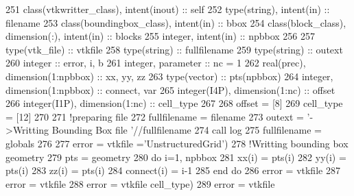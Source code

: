 \begin{DoxyCode}
251     \textcolor{keywordtype}{class}(vtkwritter\_class), \textcolor{keywordtype}{intent(inout)} :: self
252     \textcolor{keywordtype}{type}(string), \textcolor{keywordtype}{intent(in)} :: filename
253     \textcolor{keywordtype}{class}(boundingbox\_class), \textcolor{keywordtype}{intent(in)} :: bbox
254     \textcolor{keywordtype}{class}(block\_class), \textcolor{keywordtype}{dimension(:)}, \textcolor{keywordtype}{intent(in)} :: blocks
255     \textcolor{keywordtype}{integer}, \textcolor{keywordtype}{intent(in)} :: npbbox
256 
257     \textcolor{keywordtype}{type}(vtk\_file) :: vtkfile
258     \textcolor{keywordtype}{type}(string) :: fullfilename
259     \textcolor{keywordtype}{type}(string) :: outext
260     \textcolor{keywordtype}{integer} :: error, i, b
261     \textcolor{keywordtype}{integer}, \textcolor{keywordtype}{parameter} :: nc = 1
262     \textcolor{keywordtype}{real(prec)}, \textcolor{keywordtype}{dimension(1:npbbox)} :: xx, yy, zz
263     \textcolor{keywordtype}{type}(vector) :: pts(npbbox)
264     \textcolor{keywordtype}{integer}, \textcolor{keywordtype}{dimension(1:npbbox)} :: connect, var
265     \textcolor{keywordtype}{integer(I4P)}, \textcolor{keywordtype}{dimension(1:nc)} :: offset
266     \textcolor{keywordtype}{integer(I1P)}, \textcolor{keywordtype}{dimension(1:nc)} :: cell\_type
267 
268     offset = [8]
269     cell\_type = [12]
270 
271     \textcolor{comment}{!preparing file}
272     fullfilename = filename%
273     outext = \textcolor{stringliteral}{'->Writting Bounding Box file '}//fullfilename
274     \textcolor{keyword}{call }log%
275     fullfilename = globals%
276 
277     error = vtkfile%
      =\textcolor{stringliteral}{'UnstructuredGrid'})
278     \textcolor{comment}{!Writting bounding box geometry}
279     pts = geometry%
280     \textcolor{keywordflow}{do} i=1, npbbox
281         xx(i) = pts(i)%
282         yy(i) = pts(i)%
283         zz(i) = pts(i)%
284         connect(i) = i-1
285 \textcolor{keywordflow}{    end do}
286     error = vtkfile%
287     error = vtkfile%
288     error = vtkfile%
      cell\_type)
289     error = vtkfile%

\end{DoxyCode}
